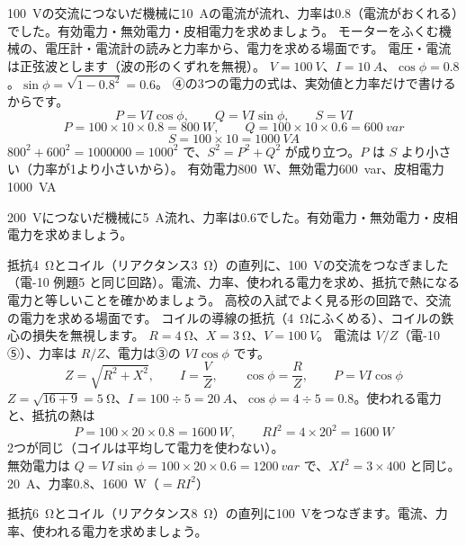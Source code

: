 \label{ph:電-11:ex1}
\begin{phreidai}
\qty{100}{V}の交流につないだ機械に\qty{10}{A}の電流が流れ、力率は0.8（電流がおくれる）でした。有効電力・無効電力・皮相電力を求めましょう。
\phbamen
モーターをふくむ機械の、電圧計・電流計の読みと力率から、電力を求める場面です。
\phmushi
電圧・電流は正弦波とします（波の形のくずれを無視）。
\phzu
$V=\qty{100}{V}$、$I=\qty{10}{A}$、$\cos\phi=0.8$。$\sin\phi=\sqrt{1-0.8^2}=0.6$。
\phriyu
④の3つの電力の式は、実効値と力率だけで書けるからです。
\phtateru
\[P=VI\cos\phi,\qquad Q=VI\sin\phi,\qquad S=VI\]
\phtoku
\[P=100\times10\times0.8=\qty{800}{W},\qquad Q=100\times10\times0.6=\qty{600}{var}\]
\[S=100\times10=\qty{1000}{VA}\]
\phtashikame
$800^2+600^2=\num{1000000}=1000^2$ で、$S^2=P^2+Q^2$ が成り立つ。$P$ は $S$ より小さい（力率が1より小さいから）。
\kotae 有効電力\qty{800}{W}、無効電力\qty{600}{var}、皮相電力\qty{1000}{VA}
\end{phreidai}
\begin{jibun}
\qty{200}{V}につないだ機械に\qty{5}{A}流れ、力率は0.6でした。有効電力・無効電力・皮相電力を求めましょう。
\end{jibun}

\label{ph:電-11:ex2}
\begin{phreidai}[抵抗とコイルの直列で使われる電力]
抵抗\qty{4}{\ohm}とコイル（リアクタンス\qty{3}{\ohm}）の直列に、\qty{100}{V}の交流をつなぎました（電-10 例題5 と同じ回路）。電流、力率、使われる電力を求め、抵抗で熱になる電力と等しいことを確かめましょう。
\phbamen
高校の入試でよく見る形の回路で、交流の電力を求める場面です。
\phmushi
コイルの導線の抵抗（\qty{4}{\ohm}にふくめる）、コイルの鉄心の損失を無視します。
\phzu
$R=\qty{4}{\ohm}$、$X=\qty{3}{\ohm}$、$V=\qty{100}{V}$。
\phriyu
電流は $V/Z$（電-10 ⑤）、力率は $R/Z$、電力は③の $VI\cos\phi$ です。
\phtateru
\[Z=\sqrt{R^2+X^2},\qquad I=\frac{V}{Z},\qquad \cos\phi=\frac{R}{Z},\qquad P=VI\cos\phi\]
\phtoku
$Z=\sqrt{16+9}=\qty{5}{\ohm}$、$I=100\div5=\qty{20}{A}$、$\cos\phi=4\div5=0.8$。使われる電力と、抵抗の熱は
\[P=100\times20\times0.8=\qty{1600}{W},\qquad RI^2=4\times20^2=\qty{1600}{W}\]
\phtashikame
2つが同じ（コイルは平均して電力を使わない）。\\
無効電力は $Q=VI\sin\phi=100\times20\times0.6=\qty{1200}{var}$ で、$XI^2=3\times400$ と同じ。
\kotae \qty{20}{A}、力率0.8、\qty{1600}{W}（$=RI^2$）
\end{phreidai}
\begin{jibun}
抵抗\qty{6}{\ohm}とコイル（リアクタンス\qty{8}{\ohm}）の直列に\qty{100}{V}をつなぎます。電流、力率、使われる電力を求めましょう。
\end{jibun}

